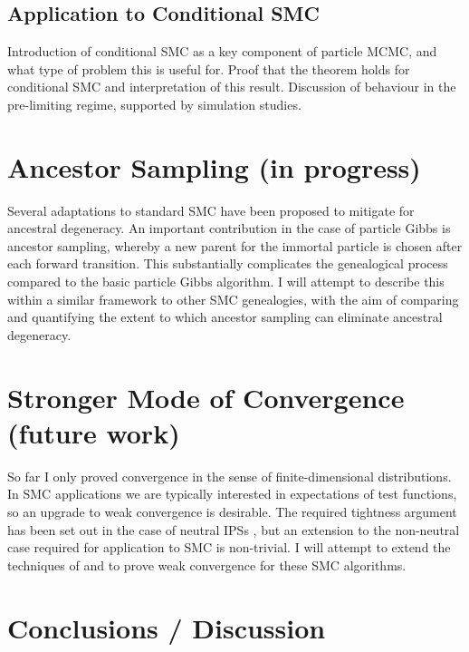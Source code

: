 \documentclass{article}
\begin{document}
\subsection{Application to Conditional SMC}
Introduction of conditional SMC as a key component of particle MCMC, and what type of problem this is useful for. Proof that the theorem holds for conditional SMC and interpretation of this result. Discussion of behaviour in the pre-limiting regime, supported by simulation studies.

\section{Ancestor Sampling (in progress)} %
Several adaptations to standard SMC have been proposed to mitigate for ancestral degeneracy. An important contribution in the case of particle Gibbs is ancestor sampling, whereby a new parent for the immortal particle is chosen after each forward transition. This substantially complicates the genealogical process compared to the basic particle Gibbs algorithm. I will attempt to describe this within a similar framework to other SMC genealogies, with the aim of comparing and quantifying the extent to which ancestor sampling can eliminate ancestral degeneracy.

\section{Stronger Mode of Convergence (future work)}
So far I only proved convergence in the sense of finite-dimensional distributions. In SMC applications we are typically interested in expectations of test functions, so an upgrade to weak convergence is desirable. The required tightness argument has been set out in the case of neutral IPSs \citep{mohle1999}, but an extension to the non-neutral case required for application to SMC is non-trivial. I will attempt to extend the techniques of \citet{mohle1999} and \citet{gerber2017} to prove weak convergence for these SMC algorithms.


\section{Conclusions / Discussion}


\end{document}

